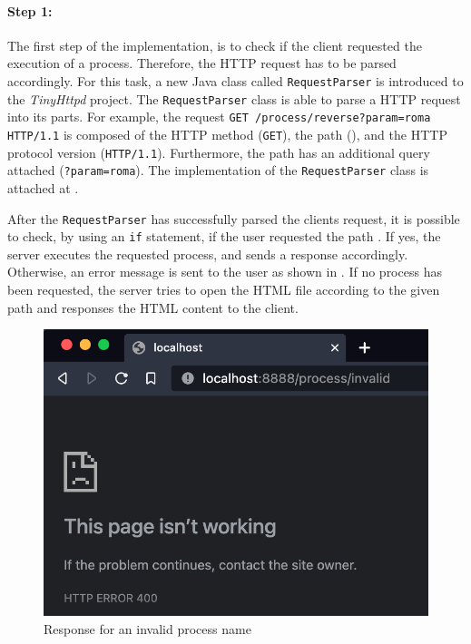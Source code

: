 \paragraph{Step 1:}
The first step of the implementation, is to check if the client requested the execution of a process. Therefore, the HTTP request has to be parsed accordingly. For this task, a new Java class called \texttt{RequestParser} is introduced to the \textit{TinyHttpd} project. The \texttt{RequestParser} class is able to parse a HTTP request into its parts. For example, the request \texttt{GET /process/reverse?param=roma HTTP/1.1} is composed of the HTTP method (\texttt{GET}), the path (), and the HTTP protocol version (\texttt{HTTP/1.1}). Furthermore, the path has an additional query attached (\texttt{?param=roma}). The implementation of the \texttt{RequestParser} class is attached at .


After the \texttt{RequestParser} has successfully parsed the clients request, it is possible to check, by using an \texttt{if} statement, if the user requested the path . If yes, the server executes the requested process, and sends a response accordingly. Otherwise, an error message is sent to the user as shown in . If no process has been requested, the server tries to open the HTML file according to the given path and responses the HTML content to the client.

\begin{figure}[h]
\centering
\includegraphics[scale=0.4]{images/invalidProcess}
\caption{Response for an invalid process name}
\label{fig:01_part1_impl_tinyhttpd_invalidprocess}
\end{figure}



